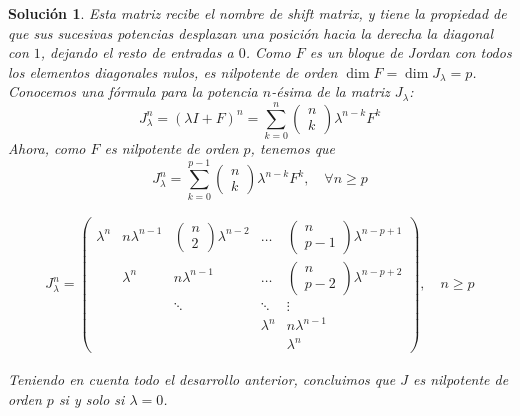 \documentclass[11pt, a4paper]{article}
\newif\IfInSansMode
\numberwithin{equation}{section}
\theoremstyle{theorem-style}
\theoremstyle{definition-style}
\theoremstyle{remark-style}
\newtheorem*{sol}{Solución}
\theoremstyle{example-style}
\begin{document}
\begin{sol}
Esta matriz recibe el nombre de \textit{shift matrix}, y tiene la propiedad de que sus sucesivas potencias desplazan una posición hacia la derecha la diagonal con $1$, dejando el resto de entradas a $0$. Como $F$ es un bloque de Jordan con todos los elementos diagonales nulos, es nilpotente de orden $\dim F = \dim J_\lambda = p$. Conocemos una fórmula para la potencia $n$-ésima de la matriz $J_\lambda$: $$ J_\lambda^n = (\lambda I + F)^n = \sum^{n}_{k=0} \begin{pmatrix}
                n \\
                k
            \end{pmatrix} \lambda^{n-k} F^k$$
        Ahora, como $F$ es nilpotente de orden $p$, tenemos que $$ J_\lambda^n = \sum^{p-1}_{k=0} \begin{pmatrix}
            n \\
            k
        \end{pmatrix} \lambda^{n-k} F^k, \quad  \forall n \geq p $$
        
        \begin{align*}
            \label{}
                J^n_\lambda = 
            \begin{pmatrix}
                \lambda^n & n\lambda^{n-1} & \begin{pmatrix}
                n\\
                2
\end{pmatrix} \lambda^{n-2} & \hdots & \begin{pmatrix}
                    n \\
                    p-1
                \end{pmatrix} \lambda^{n-p +1} \\
                 & \lambda^n & n\lambda^{n-1} & \hdots & \begin{pmatrix}
	        n\\
	        p-2
\end{pmatrix} \lambda^{n-p+2}\\
                                             &  & \ddots & \ddots & \vdots \\
                                            & & & \lambda^n & n\lambda^{n-1}\\
                                            & & & & \lambda^n
            \end{pmatrix},\quad n \ge p
        \end{align*}
        
        Teniendo en cuenta todo el desarrollo anterior, concluimos que $J$ es nilpotente de orden $p$ si y solo si $\lambda = 0$.
        

\end{sol}
\end{document}
